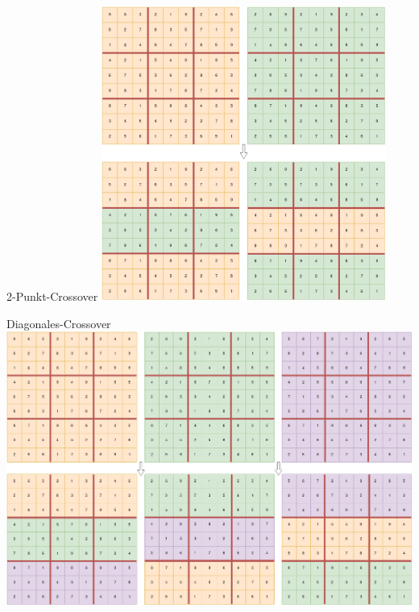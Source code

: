 \begin{frame}{2-Punkt-Crossover}
    \centering
    \includegraphics[width=0.7\textwidth]{Pictures/2-Punkt-Crossover.png}
\end{frame}
\begin{frame}{Diagonales-Crossover}
    \centering
    \includegraphics[width=\textwidth]{Pictures/Diagonales-Crossover.png}
\end{frame}